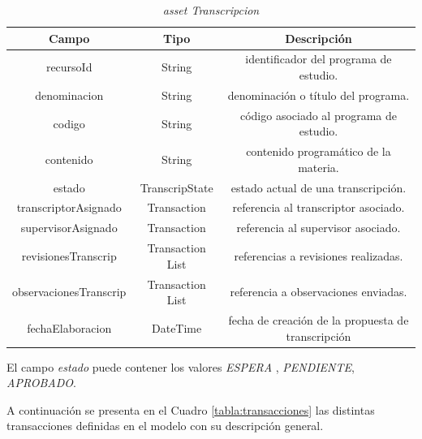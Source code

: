 \begin{table}[H]
    \caption{\textit{asset Transcripcion}}
    \centering
    \begin{tabular}{ |c |c |c| }
        \hline
        \textbf{Campo} & \textbf{Tipo} & \textbf{Descripción} \\
             \hline
             recursoId & String     & identificador del programa de estudio.\\
             denominacion & String & denominación o título del programa.\\
             codigo & String & código asociado al programa de estudio.\\
             contenido & String & contenido programático de la materia.\\
             estado & TranscripState & estado actual de una transcripción.\\
             transcriptorAsignado & Transaction &  referencia al transcriptor asociado.\\
             supervisorAsignado & Transaction & referencia al supervisor asociado.\\
             revisionesTranscrip & Transaction List & referencias a revisiones realizadas.\\
             observacionesTranscrip & Transaction List &  referencia a observaciones enviadas.\\
             fechaElaboracion & DateTime & fecha de creación de la propuesta de transcripción\\
             \hline
    \end{tabular}
    \label{tabla:transcripcion}
\end{table}

El campo \textit{estado} puede contener los valores \textit{ESPERA} , \textit{PENDIENTE}, \textit{APROBADO}.


A continuación se presenta en el Cuadro \ref{tabla:transacciones} las distintas transacciones definidas en el modelo con su descripción general.

